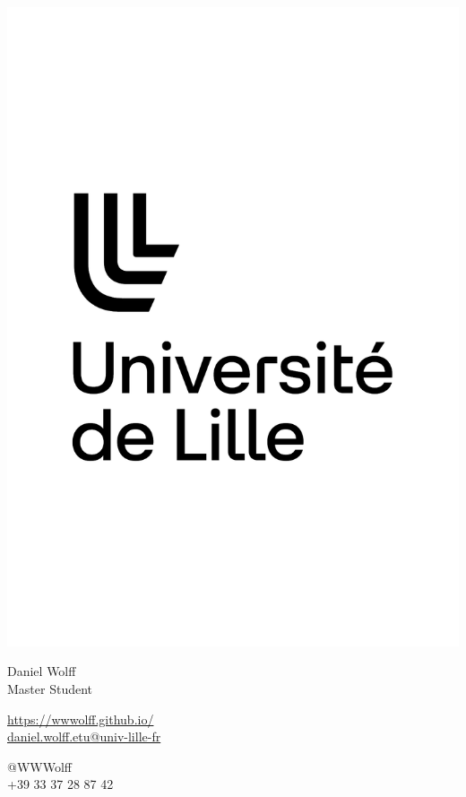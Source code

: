 \documentclass{article}
\begin{document}
\centering \includegraphics[width=.25\linewidth]{logo}\\[5pt]
\parbox{2in}{\Large \centering Daniel Wolff\\[1pt]
\normalsize Master Student}

\vfill
\raggedright
\begin{multicols}{2}
\href{https://wwwolff.github.io/}{https://wwwolff.github.io/}\\
\href{mailto:me@john.doe}{daniel.wolff.etu@univ-lille-fr}

\columnbreak
\raggedleft
@WWWolff\\
+39 33 37 28 87 42
\end{multicols}
\end{document}
